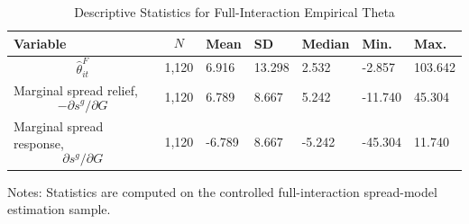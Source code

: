 \begin{table}[H]\centering
\begin{threeparttable}
\caption{Descriptive Statistics for Full-Interaction Empirical Theta}
\label{tab:theta_descriptive_stats}
\scriptsize
\begin{tabularx}{\textwidth}{lYYYYYY}
\toprule
Variable & $$N$$ & Mean & SD & Median & Min. & Max. \\
\midrule
$$\widehat{\theta}^{F}_{it}$$ & 1,120 & 6.916 & 13.298 & 2.532 & -2.857 & 103.642 \\
Marginal spread relief, $$-\partial s^g/\partial G$$ & 1,120 & 6.789 & 8.667 & 5.242 & -11.740 & 45.304 \\
Marginal spread response, $$\partial s^g/\partial G$$ & 1,120 & -6.789 & 8.667 & -5.242 & -45.304 & 11.740 \\
\bottomrule
\end{tabularx}
\begin{tablenotes}[flushleft]\footnotesize
\item Notes: Statistics are computed on the controlled full-interaction spread-model estimation sample.
\end{tablenotes}
\end{threeparttable}
\end{table}
